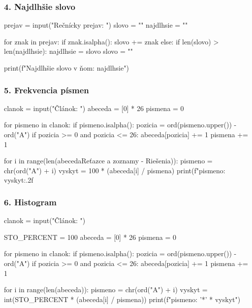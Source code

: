 \subsubsection*{4. Najdlhšie slovo}
\begin{solution}
prejav = input("Rečnícky prejav: ")
slovo = ""
najdlhsie = ""

for znak in prejav:
    if znak.isalpha():
        slovo += znak
    else:
        if len(slovo) > len(najdlhsie):
            najdlhsie = slovo
        slovo = ""

print(f"Najdlhšie slovo v ňom: {najdlhsie}")
\end{solution}

\subsubsection*{5. Frekvencia písmen}
\begin{solution}
clanok = input("Článok: ")
abeceda = [0] * 26
pismena = 0

for pismeno in clanok:
    if pismeno.isalpha():
        pozicia = ord(pismeno.upper()) - ord("A")
        if pozicia >= 0 and pozicia <= 26:
            abeceda[pozicia] += 1
            pismena += 1

for i in range(len(abecedaReťazce a zoznamy - Riešenia)):
    pismeno = chr(ord("A") + i)
    vyskyt = 100 * (abeceda[i] / pismena)
    print(f"{pismeno}: {vyskyt:.2f}%
\end{solution}

\subsubsection*{6. Histogram}
\begin{solution}
clanok = input("Článok: ")

STO_PERCENT = 100
abeceda = [0] * 26
pismena = 0

for pismeno in clanok:
    if pismeno.isalpha():
        pozicia = ord(pismeno.upper()) - ord("A")
        if pozicia >= 0 and pozicia <= 26:
            abeceda[pozicia] += 1
            pismena += 1

for i in range(len(abeceda)):
    pismeno = chr(ord("A") + i)
    vyskyt = int(STO_PERCENT * (abeceda[i] / pismena))
    print(f"{pismeno}: {'*' * vyskyt}")
\end{solution}


